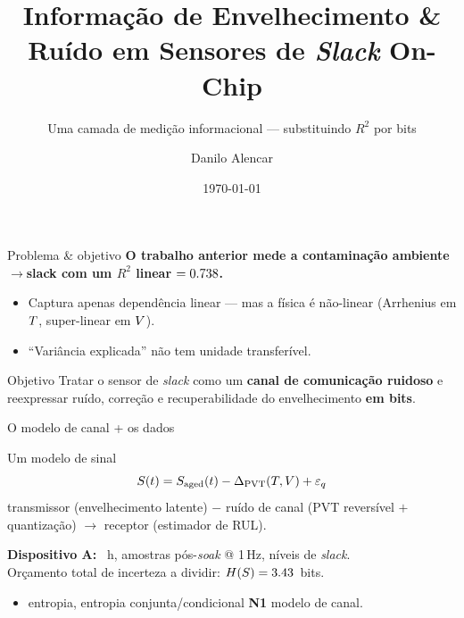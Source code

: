 \documentclass[aspectratio=169,11pt]{beamer}
\title{Informação de Envelhecimento \& Ruído em Sensores de \emph{Slack} On-Chip}
\subtitle{Uma camada de medição informacional --- substituindo $R^2$ por bits}
\author{Danilo Alencar}
\institute{PGETI / UFC --- Teoria da Informa\c{c}\~ao (TIP7266), Trabalho Final 2026.1}
\date{\today}
\begin{document}
\maketitle

\begin{frame}{Problema \& objetivo}
  \textbf{O trabalho anterior mede a contaminação ambiente$\rightarrow$slack com um $R^2$ linear $= 0.738$.}
  \begin{itemize}
    \item Captura \alert{apenas} dependência linear --- mas a física é não-linear
          (Arrhenius em $T$, super-linear em $V$).
    \item ``Variância explicada'' \alert{não tem unidade transferível}.
  \end{itemize}
  \vfill
  \begin{block}{Objetivo}
    Tratar o sensor de \emph{slack} como um \textbf{canal de comunicação ruidoso}
    e reexpressar ruído, correção e recuperabilidade do envelhecimento \textbf{em bits}.
  \end{block}
\end{frame}

\begin{frame}{O modelo de canal + os dados}
  \begin{block}{Um modelo de sinal}
    \[ S(t) = S_{\mathrm{aged}}(t) - \Delta_{\mathrm{PVT}}(T,V) + \varepsilon_q \]
    transmissor (envelhecimento latente) $-$ ruído de canal (PVT reversível $+$ quantização)
    $\rightarrow$ receptor (estimador de RUL).
  \end{block}
  \textbf{Dispositivo A:} \valDurationHours~h, \valPostSoakSamples{} amostras pós-\emph{soak} @ 1\,Hz,
  \valSlackLevels{} níveis de \emph{slack}.\\
  Orçamento total de incerteza a dividir: $H\!\left(S\right) = 3.43$~bits.
  \begin{itemize}
    \item[\textbf{N2}] entropia, entropia conjunta/condicional \quad
    \textbf{N1} modelo de canal.
  \end{itemize}
\end{frame}
\end{document}
